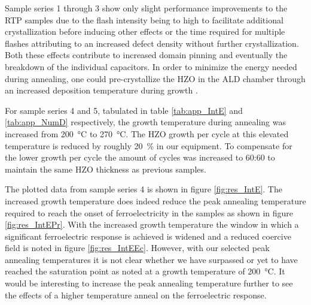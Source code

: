 \documentclass[11pt,twoside]{eitExjobb}
\begin{document}
Sample series 1 through 3 show only slight performance improvements to the RTP
samples due to the flash intensity being to high to facilitate additional
crystallization before inducing other effects or the time required for multiple
flashes attributing to an increased defect density without further
crystallization. Both these effects contribute to increased domain pinning and
eventually the breakdown of the individual capacitors. In order to minimize the
energy needed during annealing, one could pre-crystallize the HZO in the ALD
chamber through an increased deposition temperature during growth
\cite{citation needed}.

For sample series 4 and 5, tabulated in table \ref{tab:app_IntE} and
\ref{tab:app_NumD} respectively, the growth temperature during annealing was
increased from \SI{200}{\celsius} to \SI{270}{\celsius}. The HZO growth per
cycle at this elevated temperature is reduced by roughly \SI{20}{\percent} in
our equipment. To compensate for the lower growth per cycle the amount of cycles
was increased to 60:60 to maintain the same HZO thickness as previous samples.

The plotted data from sample series 4 is shown in figure \ref{fig:res_IntE}. The
increased growth temperature does indeed reduce the peak annealing temperature
required to reach the onset of ferroelectricity in the samples as shown in
figure \ref{fig:res_IntEPr}. With the increased growth temperature the window in
which a significant ferroelectric response is achieved is widened and a reduced
coercive field is noted in figure \ref{fig:res_IntEEc}. However, with our
selected peak annealing temperatures it is not clear whether we have surpassed
or yet to have reached the saturation point as noted at a growth temperature of
\SI{200}{\celsius}. It would be interesting to increase the peak annealing
temperature further to see the effects of a higher temperature anneal on the
ferroelectric response.
\end{document}
